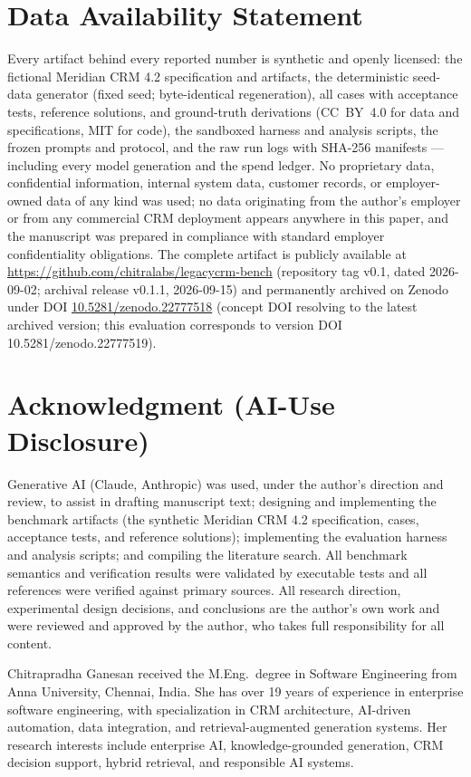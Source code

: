 \documentclass{ieeetj}
\begin{document}
\section*{Data Availability Statement}
Every artifact behind every reported number is synthetic and openly licensed: the fictional
Meridian CRM 4.2 specification and artifacts, the deterministic seed-data generator (fixed
seed; byte-identical regeneration), all \NumCases{} cases with acceptance tests, reference
solutions, and ground-truth derivations (CC~BY~4.0 for data and specifications, MIT for
code), the sandboxed harness and analysis scripts, the frozen prompts and protocol, and the
raw run logs with SHA-256 manifests --- including every model generation and the spend
ledger. No proprietary data, confidential information, internal system data, customer
records, or employer-owned data of any kind was used; no data originating from the author's
employer or from any commercial CRM deployment appears anywhere in this paper, and the
manuscript was prepared in compliance with standard employer confidentiality obligations.
The complete artifact is publicly available at \url{https://github.com/chitralabs/legacycrm-bench} (repository tag v0.1, dated 2026-09-02; archival release v0.1.1, 2026-09-15) and
permanently archived on Zenodo under DOI \href{https://doi.org/10.5281/zenodo.22777518}{10.5281/zenodo.22777518}
(concept DOI resolving to the latest archived version; this evaluation corresponds to
version DOI 10.5281/zenodo.22777519).

\section*{Acknowledgment (AI-Use Disclosure)}
Generative AI (Claude, Anthropic) was used, under the author's direction and review, to
assist in drafting manuscript text; designing and implementing the benchmark artifacts (the
synthetic Meridian CRM 4.2 specification, cases, acceptance tests, and reference solutions);
implementing the evaluation harness and analysis scripts; and compiling the literature
search. All benchmark semantics and verification results were validated by executable tests
and all references were verified against primary sources. All research direction,
experimental design decisions, and conclusions are the author's own work and were reviewed
and approved by the author, who takes full responsibility for all content.




\begin{IEEEbiographynophoto}{Chitrapradha Ganesan}
received the M.Eng.\ degree in Software Engineering from Anna
University, Chennai, India. She has over 19 years of experience in enterprise software
engineering, with specialization in CRM architecture, AI-driven automation, data
integration, and retrieval-augmented generation systems. Her research interests include
enterprise AI, knowledge-grounded generation, CRM decision support, hybrid retrieval, and
responsible AI systems.
\end{IEEEbiographynophoto}
\end{document}
